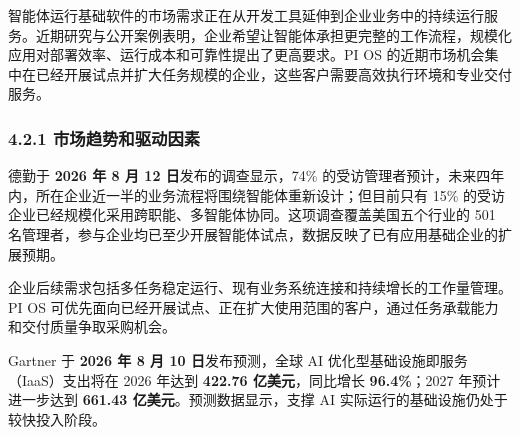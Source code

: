 智能体运行基础软件的市场需求正在从开发工具延伸到企业业务中的持续运行服务。近期研究与公开案例表明，企业希望让智能体承担更完整的工作流程，规模化应用对部署效率、运行成本和可靠性提出了更高要求。PI OS 的近期市场机会集中在已经开展试点并扩大任务规模的企业，这些客户需要高效执行环境和专业交付服务。

\subsubsection{4.2.1 市场趋势和驱动因素}\label{ux5e02ux573aux8d8bux52bfux548cux9a71ux52a8ux56e0ux7d20}


德勤于 \textbf{2026 年 8 月 12 日}发布的调查显示，74\% 的受访管理者预计，未来四年内，所在企业近一半的业务流程将围绕智能体重新设计；但目前只有 15\% 的受访企业已经规模化采用跨职能、多智能体协同。这项调查覆盖美国五个行业的 501 名管理者，参与企业均已至少开展智能体试点，数据反映了已有应用基础企业的扩展预期。

企业后续需求包括多任务稳定运行、现有业务系统连接和持续增长的工作量管理。PI OS 可优先面向已经开展试点、正在扩大使用范围的客户，通过任务承载能力和交付质量争取采购机会。


Gartner 于 \textbf{2026 年 8 月 10 日}发布预测，全球 AI 优化型基础设施即服务（IaaS）支出将在 2026 年达到 \textbf{422.76 亿美元}，同比增长 \textbf{96.4\%}；2027 年预计进一步达到 \textbf{661.43 亿美元}。预测数据显示，支撑 AI 实际运行的基础设施仍处于较快投入阶段。

